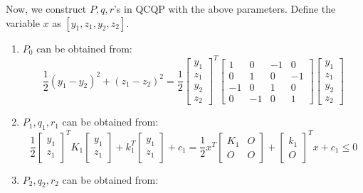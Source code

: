 \documentclass[
]{book}
\theoremstyle{definition}
\theoremstyle{definition}
\theoremstyle{definition}
\theoremstyle{definition}
\theoremstyle{remark}
\begin{document}
Now, we construct \(P, q, r\)'s in QCQP with the above parameters. Define the variable \(x\) as \([y_1, z_1, y_2, z_2]\).

\begin{enumerate}
\def\labelenumi{(\arabic{enumi})}
\item
  \(P_0\) can be obtained from:
  \begin{equation*}
     \frac{1}{2} (y_1 - y_2)^2 + (z_1 - z_2)^2 = \frac{1}{2} \begin{bmatrix}
    y_1 \\ z_1 \\ y_2 \\ z_2
     \end{bmatrix}^T \begin{bmatrix}
    1 & 0 & -1 & 0 \\ 0 & 1 & 0 & -1 \\ -1 & 0 & 1 & 0 \\ 0 & -1 & 0 & 1
     \end{bmatrix} \begin{bmatrix}
    y_1 \\ z_1 \\ y_2 \\ z_2
     \end{bmatrix}
  \end{equation*}
\item
  \(P_1, q_1, r_1\) can be obtained from:
  \begin{equation*}
     \frac{1}{2} \begin{bmatrix} y_1 \\ z_1 \end{bmatrix}^T K_1 \begin{bmatrix} y_1 \\ z_1 \end{bmatrix}
    + k_1^T \begin{bmatrix} y_1 \\ z_1 \end{bmatrix} + c_1 
     = \frac{1}{2} x^T \begin{bmatrix}
    K_1 & O \\ O & O
     \end{bmatrix} + \begin{bmatrix}
    k_1 \\ O 
     \end{bmatrix}^T x + c_1 \le 0
  \end{equation*}
\item
  \(P_2, q_2, r_2\) can be obtained from:
  \begin{equation*}

\end{equation*}
\end{enumerate}
\end{document}
